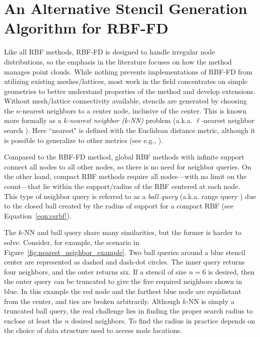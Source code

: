 \documentclass{report}
\begin{document}
\fi




\chapter{An Alternative Stencil Generation Algorithm for RBF-FD}
\label{chap:stencils}

Like all RBF methods, RBF-FD is designed to handle irregular node distributions, so the emphasis in the literature focuses on how the method manages point clouds. While nothing prevents implementations of RBF-FD from utilizing existing meshes/lattices, most work in the field concentrates on simple geometries to better understand properties of the method and develop extensions. Without mesh/lattice connectivity available, stencils are generated by choosing the $n$-nearest neighbors to a center node, inclusive of the center. This is known more formally as a \emph{$k$-nearest neighbor (k-NN)} problem \cite{TagliasacchiMFE} (a.k.a. $\ell$-nearest neighbor search \cite{WendlandBook}). Here ``nearest" is defined with the Euclidean distance metric, although it is possible to generalize to other metrics (see e.g., \cite{MatlabKDTreeSearcher}). 

Compared to the RBF-FD method, global RBF methods with infinite support connect all nodes to all other nodes, so there is no need for neighbor queries. On the other hand, compact RBF methods require all nodes---with no limit on the count---that lie within the support/radius of the RBF centered at each node. This type of neighbor query is referred to as a \emph{ball query} (a.k.a. range query \cite{WendlandBook}) due to the closed ball created by the radius of support for a compact RBF (see Equation~\ref{eqn:csrbf}). 

The $k$-NN and ball query share many similarities, but the former is harder to solve. Consider, for example, the scenario in Figure~\ref{fig:nearest_neighbor_example}. Two ball queries around a blue stencil center are represented as dashed and dash-dot circles. The inner query returns four neighbors, and the outer returns six. If a stencil of size $n=6$ is desired, then the outer query can be truncated to give the five required neighbors shown in blue. In this example the red node and the farthest blue node are equidistant from the center, and ties are broken arbitrarily. Although $k$-NN is simply a truncated ball query, the real challenge lies in finding the proper search radius to enclose at least the $n$ desired neighbors. To find the radius in practice depends on the choice of data structure used to access node locations. 
\end{document}
